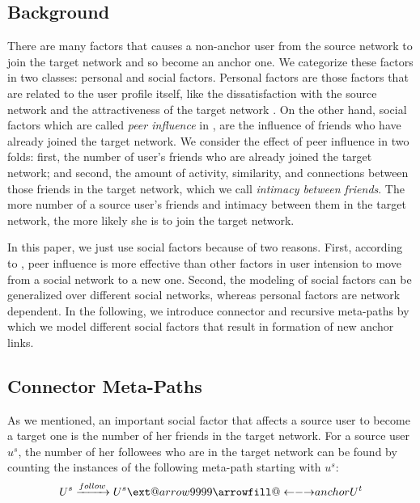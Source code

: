\documentclass[conference]{IEEEtran}
\makeatletter
\newcommand\xleftrightarrow[2][]{%
  \ext@arrow 9999{\longleftrightarrowfill@}{#1}{#2}}
\newcommand\longleftrightarrowfill@{%
  \arrowfill@\leftarrow\relbar\rightarrow}
\makeatother
\begin{document}
\subsection{Background}\label{sec:method:factors}

There are many factors that causes a non-anchor user from the source network to join the target network and so become an anchor one. We categorize these factors in two classes: personal and social factors. Personal factors are those factors that are related to the user profile itself, like the dissatisfaction with the source network and the attractiveness of the target network \cite{xu2014retaining}. On the other hand, social factors which are called \textit{peer influence} in \cite{xu2014retaining}, are the influence of friends who have already joined the target network. We consider the effect of peer influence in two folds: first, the number of user's friends who are already joined the target network; and second, the amount of activity, similarity, and connections between those friends in the target network, which we call \textit{intimacy between friends}. The more number of a source user's friends and intimacy between them in the target network, the more likely she is to join the target network.

In this paper, we just use social factors because of two reasons. First, according to \cite{xu2014retaining}, peer influence is more effective than other factors in user intension to move from a social network to a new one. Second, the modeling of social factors can be generalized over different social networks, whereas personal factors are network dependent. In the following, we introduce connector and recursive meta-paths by which we model different social factors that result in formation of new anchor links.

\subsection{Connector Meta-Paths}\label{sec:method:connector}

As we mentioned, an important social factor that affects a source user to become a target one is the number of her friends in the target network. For a source user $u^s$, the number of her followees who are in the target network can be found by counting the instances of the following meta-path starting with $u^s$:
\begin{equation*}\label{eq:neighborcount}
U^s\xrightarrow{follow}U^s\xleftrightarrow{anchor}U^t
\end{equation*}
\end{document}
